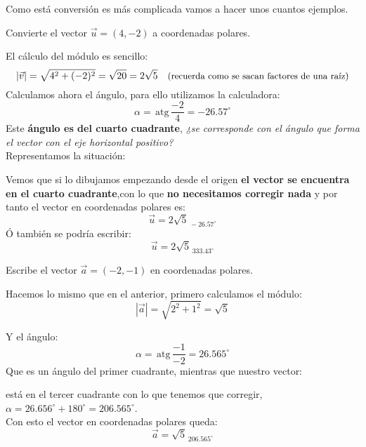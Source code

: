 \documentclass[a4paper,11pt,answers]{exam}
\newcommand{\atg}{\,\mathrm{atg}\,}
\newcommand{\degree}{^\circ}
\begin{document}
Como está conversión es más complicada vamos a hacer unos cuantos ejemplos.
\begin{questions}
\question Convierte el vector $\vec{u} = (4,-2)$ a coordenadas polares.
  \begin{solution}
    El cálculo del módulo es sencillo:
    \[|\vec{v}| = \sqrt{4^2 + (-2)^2} = \sqrt{20} = 2\sqrt{5}\quad\text{\small{(recuerda como
          se sacan factores de una raíz)}}\]
    Calculamos ahora el ángulo, para ello utilizamos la calculadora:
    \[\alpha = \atg \frac{-2}{4} = -26.57\degree\]
    Este \textbf{ángulo es del cuarto cuadrante}, \emph{¿se corresponde con el ángulo que forma
      el vector con el eje horizontal positivo?}\\
    Representamos la situación:
    \begin{center}
    \end{center}
    Vemos que si lo dibujamos empezando desde el origen \textbf{el vector se encuentra en el
      cuarto cuadrante},con lo que \textbf{no necesitamos corregir nada} y por tanto el vector
    en coordenadas polares es:
    \[\vec{u} =2\sqrt{5}_{\,-26.57\degree}\]
    Ó también se podría escribir:
    \[\vec{u} =2\sqrt{5}_{\,333.43\degree}\]
  \end{solution}
\question Escribe el vector $\vec{a} = (-2, -1)$ en coordenadas polares.
  \begin{solution}
    Hacemos lo mismo que en el anterior, primero calculamos el módulo:
    \[|\vec{a}| = \sqrt{2^2 + 1^2} = \sqrt{5}\]

    Y el ángulo:
    \[\alpha = \atg \frac{-1}{-2} = 26.565\degree\]
    Que es un ángulo del primer cuadrante, mientras que nuestro vector:
    \begin{center}
    \end{center}
    está en el tercer cuadrante con lo que tenemos que corregir, $\alpha = 26.656\degree +
    180\degree = 206.565\degree$.\\

    Con esto el vector en coordenadas polares queda:
    \[\vec{a} = \sqrt{5}_{\,206.565\degree}\]
  \end{solution}
\end{questions}
\end{document}
